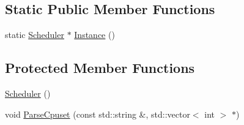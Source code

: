 \subsection*{Static Public Member Functions}
\begin{DoxyCompactItemize}
\item 
static \hyperlink{classapollo_1_1cyber_1_1scheduler_1_1Scheduler}{Scheduler} $\ast$ \hyperlink{classapollo_1_1cyber_1_1scheduler_1_1Scheduler_aa5e015eae469366b925d479ba0fd57be}{Instance} ()
\end{DoxyCompactItemize}
\subsection*{Protected Member Functions}
\begin{DoxyCompactItemize}
\item 
\hyperlink{classapollo_1_1cyber_1_1scheduler_1_1Scheduler_a6a9e79224fcd60eb611edd8107751f42}{Scheduler} ()
\item 
void \hyperlink{classapollo_1_1cyber_1_1scheduler_1_1Scheduler_ab8a015f7e4bd9481f42f7a2518bf9025}{Parse\-Cpuset} (const std\-::string \&, std\-::vector$<$ int $>$ $\ast$)
\end{DoxyCompactItemize}
